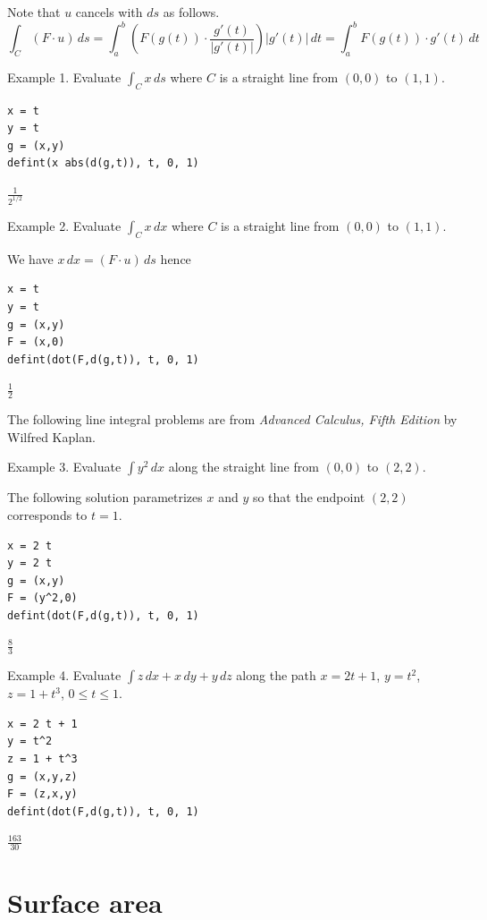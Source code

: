 \documentclass[12pt]{article}
\begin{document}
Note that $u$ cancels with $ds$ as follows.
\begin{equation*}
\int_C(F\cdot u)\,ds
=\int_a^b
\left(F(g(t))\cdot\frac{g'(t)}{|g'(t)|}\right)
|g'(t)|\,dt
=\int_a^b F(g(t))\cdot g'(t)\,dt
\end{equation*}

Example 1. Evaluate $\int_Cx\,ds$
where $C$ is a straight line from $(0,0)$ to $(1,1)$.

{\color{blue}
\begin{verbatim}
x = t
y = t
g = (x,y)
defint(x abs(d(g,t)), t, 0, 1)
\end{verbatim}}

$\displaystyle \frac{1}{2^{1/2}}$

\bigskip
Example 2. Evaluate $\int_Cx\,dx$
where $C$ is a straight line from $(0,0)$ to $(1,1)$.

\bigskip
We have $x\,dx=(F\cdot u)\,ds$ hence

{\color{blue}
\begin{verbatim}
x = t
y = t
g = (x,y)
F = (x,0)
defint(dot(F,d(g,t)), t, 0, 1)
\end{verbatim}}

$\displaystyle \tfrac{1}{2}$

\bigskip
The following line integral problems are from
{\it Advanced Calculus, Fifth Edition} by Wilfred Kaplan.

\bigskip
Example 3. Evaluate $\int y^2\,dx$ along the straight
line from $(0,0)$ to $(2,2)$.

\bigskip
The following solution parametrizes $x$ and $y$ so that
the endpoint $(2,2)$ corresponds to $t=1$.

{\color{blue}
\begin{verbatim}
x = 2 t
y = 2 t
g = (x,y)
F = (y^2,0)
defint(dot(F,d(g,t)), t, 0, 1)
\end{verbatim}}

$\displaystyle \tfrac{8}{3}$

\bigskip
Example 4. Evaluate $\int z\,dx+x\,dy+y\,dz$
along the path
$x=2t+1$, $y=t^2$, $z=1+t^3$, $0\le t\le 1$.

{\color{blue}
\begin{verbatim}
x = 2 t + 1
y = t^2
z = 1 + t^3
g = (x,y,z)
F = (z,x,y)
defint(dot(F,d(g,t)), t, 0, 1)
\end{verbatim}}

$\displaystyle \tfrac{163}{30}$

\newpage

\section{Surface area}
\end{document}
